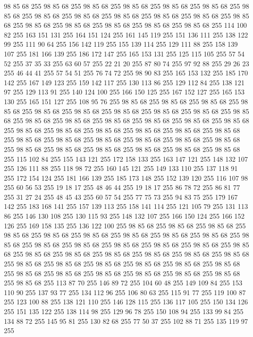 98 85 68 255 98 85 68 255 98 85 68 255 98 85 68 255 98 85 68 255 98 85 68 255 98 85 68 255 98 85 68 255 98 85 68 255 98 85 68 255 98 85 68 255 98 85 68 255 98 85 68 255 98 85 68 255 98 85 68 255 98 85 68 255 98 85 68 255 98 85 68 255 114 100 82 255 163 151 131 255 164 151 124 255 161 145 119 255 151 136 111 255 138 122 99 255 111 90 64 255 156 142 119 255 155 139 114 255 129 111 88 255 158 139 107 255 181 166 139 255 186 172 147 255 165 153 131 255 125 115 105 255 57 54 52 255 37 35 33 255 63 60 57 255 22 21 20 255 87 80 74 255 97 92 88 255 29 26 23 255 46 44 41 255 57 54 51 255 76 74 72 255 98 90 83 255 165 153 132 255 185 170 142 255 167 149 123 255 159 142 117 255 130 113 86 255 129 112 84 255 138 121 97 255 129 113 91 255 140 124 100 255 166 150 125 255 167 152 127 255 165 153 130 255 165 151 127 255 108 95 76 255 98 85 68 255 98 85 68 255 98 85 68 255 98 85 68 255 98 85 68 255 98 85 68 255
98 85 68 255 98 85 68 255 98 85 68 255 98 85 68 255 98 85 68 255 98 85 68 255 98 85 68 255 98 85 68 255 98 85 68 255 98 85 68 255 98 85 68 255 98 85 68 255 98 85 68 255 98 85 68 255 98 85 68 255 98 85 68 255 98 85 68 255 98 85 68 255 98 85 68 255 98 85 68 255 98 85 68 255 98 85 68 255 98 85 68 255 98 85 68 255 98 85 68 255 98 85 68 255 98 85 68 255 98 85 68 255 115 102 84 255 155 143 121 255 172 158 133 255 163 147 121 255 148 132 107 255 126 111 88 255 118 98 72 255 160 145 121 255 149 133 110 255 137 118 91 255 172 154 124 255 181 166 139 255 185 173 148 255 152 139 120 255 116 107 98 255 60 56 53 255 19 18 17 255 48 46 44 255 19 18 17 255 86 78 72 255 86 81 77 255 31 27 24 255 48 45 43 255 60 57 54 255 77 75 73 255 94 83 75 255 179 167 142 255 183 168 141 255 157 139 113 255 158 141 114 255 121 105 79 255 131 113 86 255 146 130 108 255 130 115 93 255 148 132 107 255 166 150 124 255
166 152 126 255 169 158 135 255 136 122 100 255 98 85 68 255 98 85 68 255 98 85 68 255 98 85 68 255 98 85 68 255 98 85 68 255 98 85 68 255 98 85 68 255 98 85 68 255 98 85 68 255 98 85 68 255 98 85 68 255 98 85 68 255 98 85 68 255 98 85 68 255 98 85 68 255 98 85 68 255 98 85 68 255 98 85 68 255 98 85 68 255 98 85 68 255 98 85 68 255 98 85 68 255 98 85 68 255 98 85 68 255 98 85 68 255 98 85 68 255 98 85 68 255 98 85 68 255 98 85 68 255 98 85 68 255 98 85 68 255 98 85 68 255 98 85 68 255 98 85 68 255 113 87 70 255 146 89 72 255 104 60 48 255 149 109 84 255 153 110 90 255 137 93 77 255 134 112 96 255 106 80 63 255 115 91 77 255 119 100 87 255 123 100 88 255 138 121 110 255 146 128 115 255 136 117 105 255 150 134 126 255 151 135 122 255 138 114 98 255 129 96 78 255 150 108 94 255 133 99 84 255 134 88 72 255 145 95 81 255 130 82 68 255 77 50 37 255 102 88 71 255 135 119 97 255

